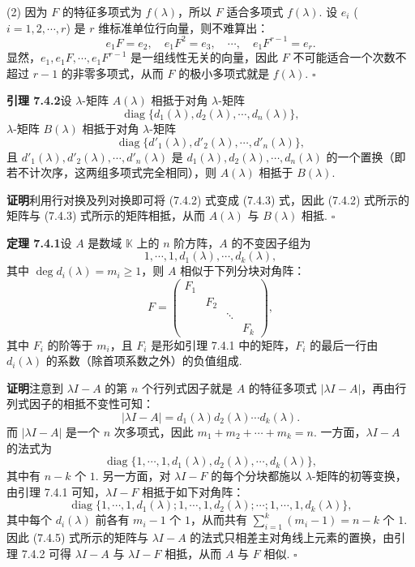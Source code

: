 \documentclass[UTF8, 12pt, fontset=fandol, oneside]{ctexart}
\begin{document}
(2) 因为 $F$ 的特征多项式为 $f(\lambda)$，所以 $F$ 适合多项式 $f(\lambda)$. 设 $e_i$ ($i=1,2,\cdots,r$) 是 $r$ 维标准单位行向量，则不难算出：
\[
e_1F=e_2,\quad e_1F^2=e_3,\quad \cdots,\quad e_1F^{r-1}=e_r.
\]
显然，$e_1,e_1F,\cdots,e_1F^{r-1}$ 是一组线性无关的向量，因此 $F$ 不可能适合一个次数不超过 $r-1$ 的非零多项式，从而 $F$ 的极小多项式就是 $f(\lambda)$. $\square$

\noindent\textbf{引理 7.4.2}\quad 设 $\lambda$-矩阵 $A(\lambda)$ 相抵于对角 $\lambda$-矩阵
\begin{equation}
\operatorname{diag}\{d_1(\lambda),d_2(\lambda),\cdots,d_n(\lambda)\},
\tag{7.4.2}
\end{equation}
$\lambda$-矩阵 $B(\lambda)$ 相抵于对角 $\lambda$-矩阵
\begin{equation}
\operatorname{diag}\{d'_1(\lambda),d'_2(\lambda),\cdots,d'_n(\lambda)\},
\tag{7.4.3}
\end{equation}
且 $d'_1(\lambda),d'_2(\lambda),\cdots,d'_n(\lambda)$ 是 $d_1(\lambda),d_2(\lambda),\cdots,d_n(\lambda)$ 的一个置换（即若不计次序，这两组多项式完全相同），则 $A(\lambda)$ 相抵于 $B(\lambda)$.

\noindent\textbf{证明}\quad 利用行对换及列对换即可将 (7.4.2) 式变成 (7.4.3) 式，因此 (7.4.2) 式所示的矩阵与 (7.4.3) 式所示的矩阵相抵，从而 $A(\lambda)$ 与 $B(\lambda)$ 相抵. $\square$

\noindent\textbf{定理 7.4.1}\quad 设 $A$ 是数域 $\mathbb{K}$ 上的 $n$ 阶方阵，$A$ 的不变因子组为
\[
1,\cdots,1,d_1(\lambda),\cdots,d_k(\lambda),
\]
其中 $\deg d_i(\lambda)=m_i\geq 1$，则 $A$ 相似于下列分块对角阵：
\begin{equation}
F=\left(\begin{array}{cccc}
F_1 & & & \\
& F_2 & & \\
& & \ddots & \\
& & & F_k
\end{array}\right),
\tag{7.4.4}
\end{equation}
其中 $F_i$ 的阶等于 $m_i$，且 $F_i$ 是形如引理 7.4.1 中的矩阵，$F_i$ 的最后一行由 $d_i(\lambda)$ 的系数（除首项系数之外）的负值组成.

\noindent\textbf{证明}\quad 注意到 $\lambda I-A$ 的第 $n$ 个行列式因子就是 $A$ 的特征多项式 $|\lambda I-A|$，再由行列式因子的相抵不变性可知：
\[
|\lambda I-A|=d_1(\lambda)d_2(\lambda)\cdots d_k(\lambda).
\]
而 $|\lambda I-A|$ 是一个 $n$ 次多项式，因此 $m_1+m_2+\cdots+m_k=n$. 一方面，$\lambda I-A$ 的法式为
\[
\operatorname{diag}\{1,\cdots,1,d_1(\lambda),d_2(\lambda),\cdots,d_k(\lambda)\},
\]
其中有 $n-k$ 个 $1$. 另一方面，对 $\lambda I-F$ 的每个分块都施以 $\lambda$-矩阵的初等变换，由引理 7.4.1 可知，$\lambda I-F$ 相抵于如下对角阵：
\begin{equation}
\operatorname{diag}\{1,\cdots,1,d_1(\lambda);1,\cdots,1,d_2(\lambda);\cdots;1,\cdots,1,d_k(\lambda)\},
\tag{7.4.5}
\end{equation}
其中每个 $d_i(\lambda)$ 前各有 $m_i-1$ 个 $1$，从而共有 $\sum_{i=1}^k(m_i-1)=n-k$ 个 $1$. 因此 (7.4.5) 式所示的矩阵与 $\lambda I-A$ 的法式只相差主对角线上元素的置换，由引理 7.4.2 可得 $\lambda I-A$ 与 $\lambda I-F$ 相抵，从而 $A$ 与 $F$ 相似. $\square$
\end{document}
